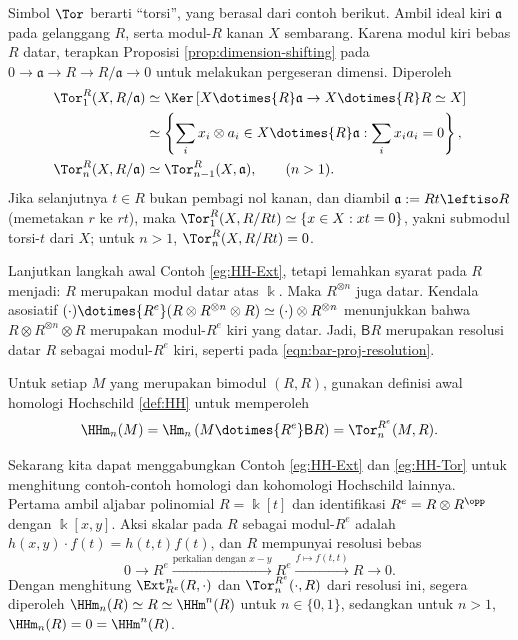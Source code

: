 \begin{catatan}
Simbol $\Tor$ berarti ``torsi'', yang berasal dari contoh berikut. Ambil
ideal kiri $\mathfrak{a}$ pada gelanggang $R$, serta modul-$R$ kanan $X$
sembarang. Karena modul kiri bebas $R$ datar, terapkan Proposisi
\ref{prop:dimension-shifting} pada $0\to\mathfrak{a}\to R\to
R/\mathfrak{a}\to0$ untuk melakukan pergeseran dimensi. Diperoleh
\begin{align*}
\Tor^R_1(X,R/\mathfrak{a}) &\simeq \Ker\left[
X\dotimes{R}\mathfrak{a}\to X\dotimes{R}R\simeq X\right]\\
&\simeq \left\{\sum_i x_i\otimes a_i\in X\dotimes{R}\mathfrak{a}:
\sum_i x_i a_i=0\right\},\\
\Tor^R_n(X,R/\mathfrak{a})&\simeq\Tor^R_{n-1}(X,\mathfrak{a}),\qquad(n>1).
\end{align*}
Jika selanjutnya $t\in R$ bukan pembagi nol kanan, dan diambil
$\mathfrak{a}:=Rt\leftiso R$ (memetakan $r$ ke $rt$), maka
$\Tor^R_1(X,R/Rt)\simeq\{x\in X:xt=0\}$, yakni submodul torsi-$t$ dari $X$;
untuk $n>1$, $\Tor^R_n(X,R/Rt)=0$.
\end{catatan}

\begin{contoh}\label{eg:HH-Tor}
Lanjutkan langkah awal Contoh \ref{eg:HH-Ext}, tetapi lemahkan syarat pada
$R$ menjadi: $R$ merupakan modul datar atas $\Bbbk$. Maka $R^{\otimes n}$
juga datar. Kendala asosiatif
$(\cdot)\dotimes{R^e}(R\otimes R^{\otimes n}\otimes R)\simeq
(\cdot)\otimes R^{\otimes n}$ menunjukkan bahwa
$R\otimes R^{\otimes n}\otimes R$ merupakan modul-$R^e$ kiri yang datar.
Jadi, $\mathsf{B}R$ merupakan resolusi datar $R$ sebagai modul-$R^e$ kiri,
seperti pada \eqref{eqn:bar-proj-resolution}.

Untuk setiap $M$ yang merupakan bimodul $(R,R)$, gunakan definisi awal homologi Hochschild
\ref{def:HH} untuk memperoleh
\[
\HHm_n(M)=\Hm_n\left(M\dotimes{R^e}\mathsf{B}R\right)
=\Tor_n^{R^e}(M,R).
\]
\end{contoh}

Sekarang kita dapat menggabungkan Contoh \ref{eg:HH-Ext} dan
\ref{eg:HH-Tor} untuk menghitung contoh-contoh homologi dan kohomologi
Hochschild lainnya. Pertama ambil aljabar polinomial $R=\Bbbk[t]$ dan
identifikasi $R^e=R\otimes R^{\opp}$ dengan $\Bbbk[x,y]$. Aksi skalar pada
$R$ sebagai modul-$R^e$ adalah $h(x,y)\cdot f(t)=h(t,t)f(t)$, dan $R$
mempunyai resolusi bebas
\[
0\to R^e\xrightarrow{\text{perkalian dengan }x-y}R^e
\xrightarrow{f\mapsto f(t,t)}R\to0.
\]
Dengan menghitung $\Ext^n_{R^e}(R,\cdot)$ dan $\Tor_n^{R^e}(\cdot,R)$ dari
resolusi ini, segera diperoleh $\HHm_n(R)\simeq R\simeq\HHm^n(R)$ untuk
$n\in\{0,1\}$,
sedangkan untuk $n>1$, $\HHm_n(R)=0=\HHm^n(R)$.

